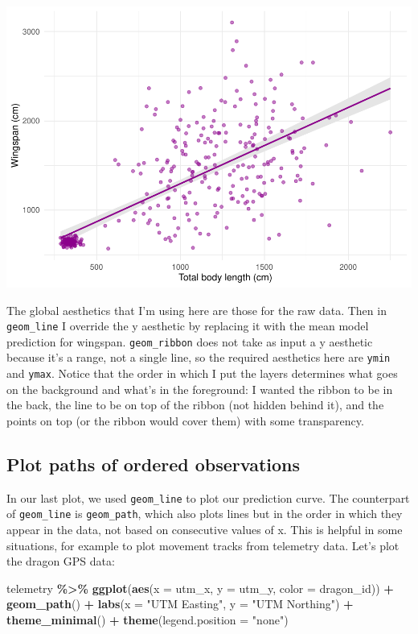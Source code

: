 \documentclass[
]{book}
\newenvironment{Shaded}{\begin{snugshade}}{\end{snugshade}}
\newcommand{\AttributeTok}[1]{\textcolor[rgb]{0.13,0.29,0.53}{#1}}
\newcommand{\FunctionTok}[1]{\textcolor[rgb]{0.13,0.29,0.53}{\textbf{#1}}}
\newcommand{\NormalTok}[1]{#1}
\newcommand{\SpecialCharTok}[1]{\textcolor[rgb]{0.81,0.36,0.00}{\textbf{#1}}}
\newcommand{\StringTok}[1]{\textcolor[rgb]{0.31,0.60,0.02}{#1}}
\begin{document}
\includegraphics{reproducible-science_files/figure-latex/gg30-1.pdf}

The global aesthetics that I'm using here are those for the raw data. Then in
\texttt{geom\_line} I override the y aesthetic by replacing it with the mean model
prediction for wingspan. \texttt{geom\_ribbon} does not take as input a y aesthetic
because it's a range, not a single line, so the required aesthetics here are
\texttt{ymin} and \texttt{ymax}. Notice that the order in which I put the layers determines
what goes on the background and what's in the foreground: I wanted the ribbon to
be in the back, the line to be on top of the ribbon (not hidden behind it), and
the points on top (or the ribbon would cover them) with some transparency.

\hypertarget{plot-paths-of-ordered-observations}{%
\subsection{Plot paths of ordered observations}\label{plot-paths-of-ordered-observations}}

In our last plot, we used \texttt{geom\_line} to plot our prediction curve. The
counterpart of \texttt{geom\_line} is \texttt{geom\_path}, which also plots lines but in the
order in which they appear in the data, not based on consecutive values of x.
This is helpful in some situations, for example to plot movement tracks from
telemetry data. Let's plot the dragon GPS data:

\begin{Shaded}
\begin{Highlighting}[]
\NormalTok{telemetry }\SpecialCharTok{\%\textgreater{}\%} 
  \FunctionTok{ggplot}\NormalTok{(}\FunctionTok{aes}\NormalTok{(}\AttributeTok{x =}\NormalTok{ utm\_x, }\AttributeTok{y =}\NormalTok{ utm\_y, }\AttributeTok{color =}\NormalTok{ dragon\_id)) }\SpecialCharTok{+}
  \FunctionTok{geom\_path}\NormalTok{() }\SpecialCharTok{+}
  \FunctionTok{labs}\NormalTok{(}\AttributeTok{x =} \StringTok{"UTM Easting"}\NormalTok{, }\AttributeTok{y =} \StringTok{"UTM Northing"}\NormalTok{) }\SpecialCharTok{+}
  \FunctionTok{theme\_minimal}\NormalTok{() }\SpecialCharTok{+}
  \FunctionTok{theme}\NormalTok{(}\AttributeTok{legend.position =} \StringTok{"none"}\NormalTok{)}
\end{Highlighting}
\end{Shaded}
\end{document}

